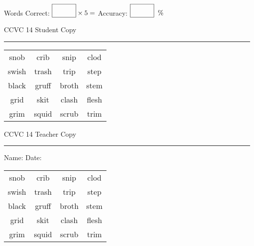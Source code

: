 \documentclass{memoir}
\begin{document}
\small

Words Correct: $\fbox{\phantom{\huge 100}} \times 5 = $ Accuracy: $\fbox{\phantom{\huge 100}}\;\; \%$ 

\vfill

\newpage


\footnotesize \noindent
CCVC 14 \hfill Student Copy
\smallskip
\hrule

\Large

\setlength{\tabcolsep}{14pt}
\def\arraystretch{3}

{\selectfont


\begin{vplace}[0.5]
\begin{center}
\begin{tabular}{cccc}
snob & crib & snip & clod \\
swish & trash & trip & step \\
black            & gruff & broth    & stem \\
grid & skit & clash            & flesh             \\
grim       & squid & scrub & trim \\
\end{tabular}
\end{center}
\end{vplace}

}

\newpage

\footnotesize \noindent
CCVC 14 \hfill Teacher Copy
\smallskip
\hrule

\small

\vfill

\noindent
Name: \underline{\hspace{1.75in}} \hfill Date: \underline{\hspace{1in}}

\Large

{\selectfont


\begin{vplace}[0.5]
\begin{center}
\begin{tabular}{cccc}
snob & crib & snip & clod \\
swish & trash & trip & step \\
black            & gruff & broth    & stem \\
grid & skit & clash            & flesh             \\
grim       & squid & scrub & trim \\
\end{tabular}
\end{center}
\end{vplace}



}
\end{document}
